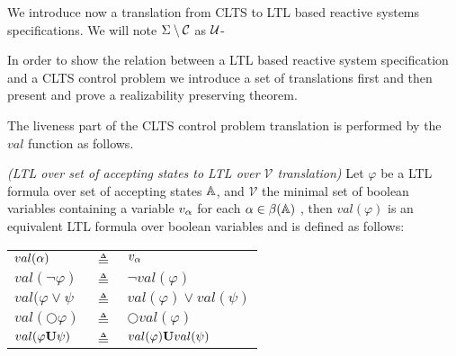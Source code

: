 
We introduce now a translation from CLTS to LTL based reactive systems specifications. We will note $\Sigma \setminus \mathcal{C}$ as $\mathcal{U}$-


In order to show the relation between a LTL based reactive system specification and a CLTS control problem we introduce a set of translations first and then present and prove a realizability preserving theorem.

The liveness part of the CLTS control problem translation is performed by the $val$ function as follows.
\begin{definition}
	\label{def:val_ltl} \emph{(LTL over set of accepting states to LTL over $\mathcal{V}$ translation)} 
	Let $\varphi$ be a LTL formula over set of accepting states $\mathbb{A}$, and $\mathcal{V}$ the minimal set of boolean variables containing a variable $v_{\alpha}$ for each $\alpha \in \beta(\mathbb{A})$ , then $val(\varphi)$ is an equivalent LTL formula over boolean variables and is defined as follows:\\
	
	\begin{tabular}{ l c l }
		$val(\alpha)$ & $\triangleq$ & $v_{\alpha}$\\	
		$val(\neg \varphi)$ & $\triangleq$ & $\neg val(\varphi)$\\
		$val(\varphi \vee \psi$ & $\triangleq$ & $val(\varphi) \vee val(\psi)$\\
		$val(\bigcirc \varphi)$ & $\triangleq$ & $\bigcirc val(\varphi)$\\
		$val(\varphi {\bf U} \psi)$ & $\triangleq$ & $val(\varphi) {\bf U} val(\psi)$\\
	\end{tabular}	
\end{definition}


